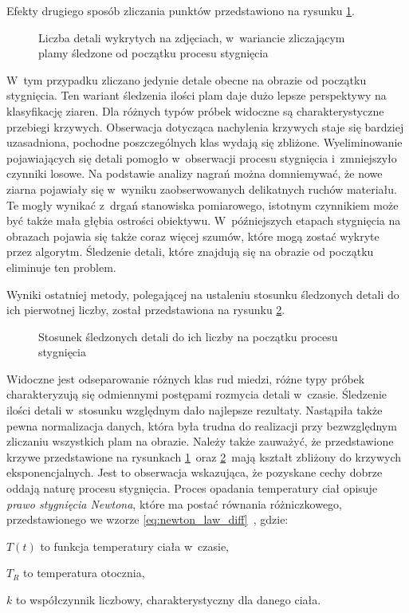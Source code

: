 Efekty drugiego sposób zliczania punktów przedstawiono na rysunku
\ref{fig:blob_chart_rem}.~%
\begin{figure}[htb]
    \centering
    
    \caption{Liczba detali wykrytych na zdjęciach, w~wariancie zliczającym
        plamy śledzone od początku procesu stygnięcia}
    \label{fig:blob_chart_rem}
\end{figure}
W~tym przypadku zliczano jedynie detale obecne na obrazie od początku
stygnięcia.
Ten wariant śledzenia ilości plam daje dużo lepsze perspektywy na klasyfikację
ziaren.
Dla różnych typów próbek widoczne są charakterystyczne przebiegi krzywych.
Obserwacja dotycząca nachylenia krzywych staje się bardziej uzasadniona,
pochodne poszczególnych klas wydają się zbliżone.
Wyeliminowanie pojawiających się detali pomogło w~obserwacji procesu stygnięcia
i~zmniejszyło czynniki losowe.
Na podstawie analizy nagrań można domniemywać, że nowe ziarna pojawiały się
w~wyniku zaobserwowanych delikatnych ruchów materiału.
Te mogły wynikać z~drgań stanowiska pomiarowego, istotnym czynnikiem może być
także mała głębia ostrości obiektywu.
W~późniejszych etapach stygnięcia na obrazach pojawia się także coraz więcej
szumów, które mogą zostać wykryte przez algorytm.
Śledzenie detali, które znajdują się na obrazie od początku eliminuje ten
problem.

Wyniki ostatniej metody, polegającej na ustaleniu stosunku śledzonych detali
do ich pierwotnej liczby, został przedstawiona na rysunku
\ref{fig:blob_chart_ratio}.~%
\begin{figure}[htb]
    \centering
    
    \caption{Stosunek śledzonych detali do ich liczby na początku procesu
        stygnięcia}
    \label{fig:blob_chart_ratio}
\end{figure}
Widoczne jest odseparowanie różnych klas rud miedzi, różne typy próbek
charakteryzują się odmiennymi postępami rozmycia detali w~czasie.
Śledzenie ilości detali w~stosunku względnym dało najlepsze rezultaty.
Nastąpiła także pewna normalizacja danych, która była trudna do realizacji przy
bezwzględnym zliczaniu wszystkich plam na obrazie.
Należy także zauważyć, że przedstawione krzywe przedstawione na rysunkach
\ref{fig:blob_chart_rem}~oraz \ref{fig:blob_chart_ratio}~mają kształt zbliżony
do krzywych eksponencjalnych.
Jest to obserwacja wskazująca, że pozyskane cechy dobrze oddają naturę procesu
stygnięcia.
Proces opadania temperatury ciał opisuje \emph{prawo stygnięcia Newtona}, które
ma postać równania różniczkowego, przedstawionego we wzorze
\ref{eq:newton_law_diff}~\cite{lienhard_heat}, gdzie:
\begin{description}
    \item $ T \left( t \right) $ to funkcja temperatury ciała w~czasie,
    \item $ T_R $ to temperatura otocznia,
    \item $ k $ to współczynnik liczbowy, charakterystyczny dla danego ciała.
\end{description}

